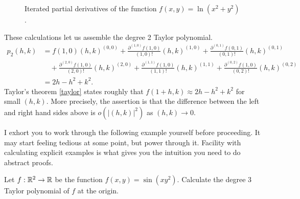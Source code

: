 \begin{example}
\begin{figure}
\begin{center}
		\end{center}
		\caption{Iterated partial derivatives of the function $f(x,y) = \ln(x^2+y^2)$.} \label{partial-derivatives-tree}
	\end{figure}
	
	These calculations let us assemble the degree 2 Taylor polynomial. 
	\[ \begin{aligned} p_2(h,k) &= f(1,0) (h,k)^{(0,0)} + \frac{\partial^{(1,0)}f(1,0)}{(1,0)!}(h,k)^{(1,0)} + \frac{\partial^{(0,1)}f(0,1)}{(0,1)!}(h,k)^{(0,1)}  \\
	&\quad + \frac{\partial^{(2,0)}f(1,0)}{(2,0)!}(h,k)^{(2,0)} + \frac{\partial^{(1,1)}f(1,0)}{(1,1)!}(h,k)^{(1,1)} + \frac{\partial^{(0,2)}f(1,0)}{(0,2)!}(h,k)^{(0,2)} \\
	&= 2h - h^2 + k^2. \end{aligned} \]
	Taylor's theorem \ref{taylor} states roughly that $f(1+h,k) \approx 2h - h^2 + k^2$ for small $(h,k)$. More precisely, the assertion is that the difference between the left and right hand sides above is $o(|(h,k)|^2)$ as $(h,k) \to 0$. 
\end{example}

I exhort you to work through the following example yourself before proceeding. It may start feeling tedious at some point, but power through it. Facility with calculating explicit examples is what gives you the intuition you need to do abstract proofs. 

\begin{exercise}
	Let $f : \mathbb{R}^2 \to \mathbb{R}$ be the function $f(x,y) = \sin(xy^2)$. Calculate the degree 3 Taylor polynomial of $f$ at the origin. 
\end{exercise}


